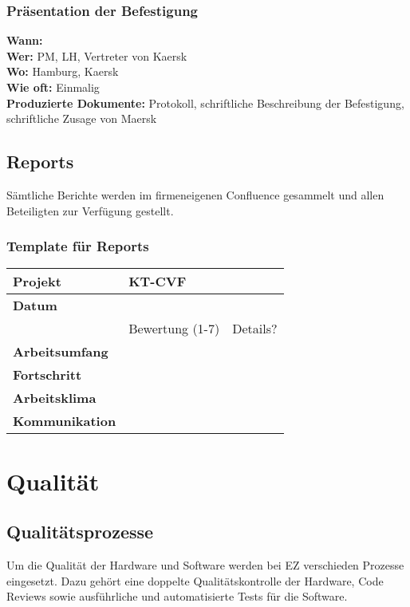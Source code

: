 \subsubsection{Präsentation der Befestigung}
\textbf{Wann:} \\
\textbf{Wer:} PM, LH, Vertreter von Kaersk\\
\textbf{Wo:} Hamburg, Kaersk\\
\textbf{Wie oft:} Einmalig\\
\textbf{Produzierte Dokumente:} Protokoll, schriftliche Beschreibung der Befestigung, schriftliche Zusage von Maersk

\subsection{Reports}
Sämtliche Berichte werden im firmeneigenen Confluence gesammelt und allen Beteiligten zur Verfügung gestellt.

\subsubsection{Template für Reports}

\begin{table}[H]
	\renewcommand{\arraystretch}{1.4}
	\begin{center}
		\begin{tabular}{|l|l|l|}\hline
			\textbf{Projekt} & \multicolumn{2}{l|}{KT-CVF }\\\hline
			\textbf{Datum} &\multicolumn{2}{l|}{} \\ \hline
			& Bewertung (1-7) & Details?\\\hline
			\textbf{Arbeitsumfang} && \qquad\qquad\qquad\qquad\\\hline
			\textbf{Fortschritt} && \\\hline
			\textbf{Arbeitsklima} & &\\\hline
			\textbf{Kommunikation} & &\\\hline
		\end{tabular}
	\end{center}
\end{table}

\section{Qualität}
\subsection{Qualitätsprozesse}
Um die Qualität der Hardware und Software werden bei EZ verschieden Prozesse eingesetzt. Dazu gehört eine doppelte Qualitätskontrolle der Hardware, Code Reviews sowie ausführliche und automatisierte Tests für die Software.
